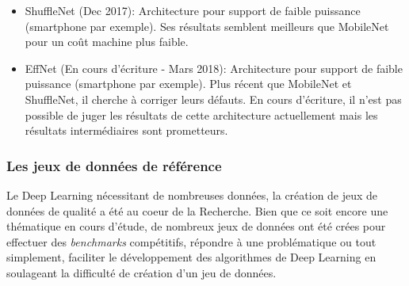 \begin{itemize}
    \item ShuffleNet\cite{shufflenet} (Dec 2017): Architecture pour support de faible puissance (smartphone par exemple). Ses résultats semblent meilleurs que MobileNet pour un coût machine plus faible.
    \item EffNet\cite{effnet} (En cours d'écriture - Mars 2018): Architecture pour support de faible puissance (smartphone par exemple). Plus récent que MobileNet et ShuffleNet, il cherche à corriger leurs défauts. En cours d'écriture, il n'est pas possible de juger les résultats de cette architecture actuellement mais les résultats intermédiaires sont prometteurs.
\end{itemize}

\subsubsection{Les jeux de données de référence}
Le Deep Learning nécessitant de nombreuses données, la création de jeux de données de qualité a été au coeur de la Recherche. Bien que ce soit encore une thématique en cours d'étude, de nombreux jeux de données ont été crées pour effectuer des \textit{benchmarks} compétitifs, répondre à une problématique ou tout simplement, faciliter le développement des algorithmes de Deep Learning en soulageant la difficulté de création d'un jeu de données. \\

